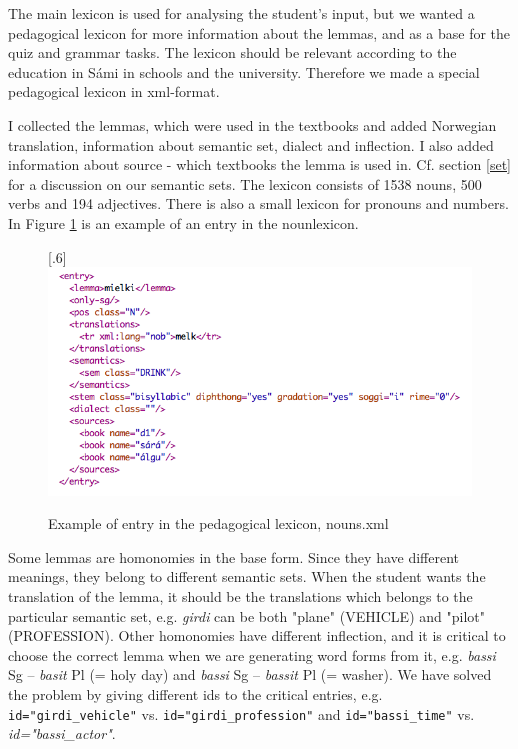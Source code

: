 \documentclass[a4paper,12pt]{article}
\begin{document}
The main lexicon is used for analysing the student’s input, but we wanted a pedagogical lexicon for more information about the lemmas, and as a base for the quiz and grammar tasks. The lexicon should be relevant according to the education in Sámi in schools and the university. Therefore we made a special pedagogical lexicon in xml-format. 

I collected the lemmas, which were used in the textbooks and added Norwegian translation, information about semantic set, dialect and inflection. I also added information about source - which textbooks the lemma is used in. Cf. section \ref{set} for a discussion on our semantic sets. The lexicon consists of 1538 nouns, 500 verbs and 194 adjectives. There is also a small lexicon for pronouns and numbers. In Figure \ref{nounlex} is an example of an entry in the nounlexicon. \\


\begin{figure}[htbp]
\begin{center}
\scalebox{.6}[.6]{\includegraphics{img/nounlexicon.png}}\\
\caption{Example of entry in the pedagogical lexicon, nouns.xml}
\label{nounlex}
\end{center}
\end{figure}

Some lemmas are homonomies in the base form. Since they have different meanings, they belong to different semantic sets. When the student wants the translation of the lemma, it should be the translations which belongs to the particular semantic set, e.g. \textit{girdi} can be both "plane" (VEHICLE) and "pilot" (PROFESSION). Other homonomies have different inflection, and it is critical to choose the correct lemma when we are generating word forms from it, e.g. \textit{bassi} Sg -- \textit{basit} Pl (= holy day) and \textit{bassi} Sg -- \textit{bassit} Pl (= washer). We have solved the problem by giving different ids to the critical entries, e.g. \texttt{id="girdi\_vehicle"} vs. 
\texttt{id="girdi\_profession"} and \texttt{id="bassi\_time"} vs. \textit{id="bassi\_actor"}.
\end{document}
